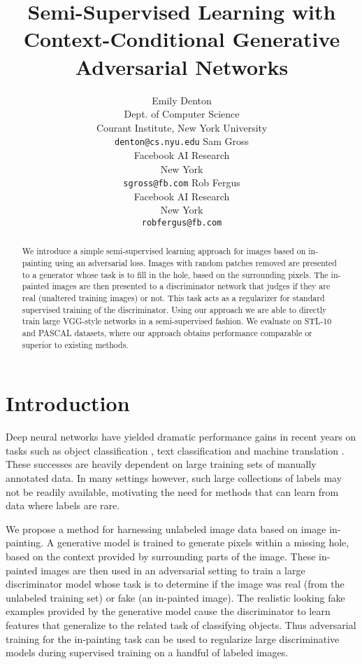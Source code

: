 \documentclass{article} %
\title{Semi-Supervised Learning with \\Context-Conditional Generative \\Adversarial Networks}
\author{Emily Denton\\
Dept. of Computer Science\\
Courant Institute, New York University\\
\texttt{denton@cs.nyu.edu}
\And
Sam Gross\\
Facebook AI Research \\
New York\\
\texttt{sgross@fb.com}
\And
Rob Fergus \\
Facebook AI Research \\
New York\\
\texttt{robfergus@fb.com}
}
\begin{document}
\maketitle  

\vspace{-5mm}
\begin{abstract}
  We introduce a simple semi-supervised learning approach for images based on
  in-painting using an adversarial loss. Images with random
  patches removed are presented to a generator whose task is to fill
  in the hole, based on the surrounding pixels. The in-painted images
  are then presented to a discriminator network that judges if they
  are real (unaltered training images) or not. This task acts as a
  regularizer for standard supervised training of the
  discriminator. Using our approach we are able to directly train
  large VGG-style networks in a semi-supervised fashion. We evaluate
  on STL-10 and PASCAL datasets, where our approach obtains
  performance comparable or superior to existing methods.
\end{abstract}


\section{Introduction}

Deep neural networks have yielded dramatic performance gains in recent
years on tasks such as object classification \citep{krizhevsky2012},
text classification \citep{zhang2015} and machine translation
\citep{sutskever2014,bahdanau2015}.  These successes are heavily
dependent on large training sets of manually annotated data.  In many
settings however, such large collections of labels may not be readily
available, motivating the need for methods that can learn from data
where labels are rare.

We propose a method for harnessing unlabeled image data based on
image in-painting. A generative model is trained to generate pixels within a
missing hole, based on the context provided by surrounding parts of
the image. These in-painted images are then used in an adversarial
setting \citep{goodfellow2014} to train a large discriminator model whose task is
to determine if the image was real (from the unlabeled training
set) or fake (an in-painted image). The realistic looking
fake examples provided by the generative model cause the discriminator
to learn features that generalize to the related task of classifying
objects. Thus adversarial training for the in-painting task can be
used to regularize large discriminative models during supervised
training on a handful of labeled images. 
\end{document}
